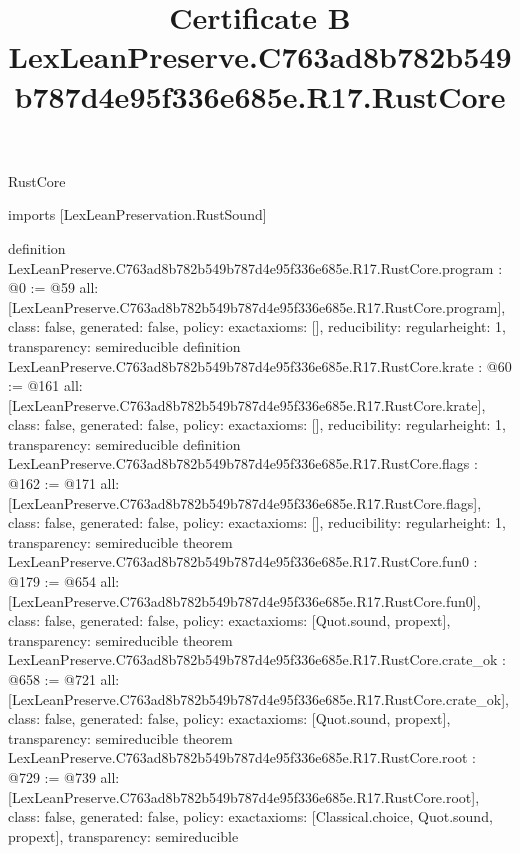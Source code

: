 \begin{lexlean}{RustCore}
\title{Certificate B LexLeanPreserve.C763ad8b782b549b787d4e95f336e685e.R17.RustCore}
\begin{coremodule}
imports [LexLeanPreservation.RustSound]

definition LexLeanPreserve.C763ad8b782b549b787d4e95f336e685e.R17.RustCore.program : @0 := @59 {
  all: [LexLeanPreserve.C763ad8b782b549b787d4e95f336e685e.R17.RustCore.program],
  class: false,
  generated: false,
  policy: exact{axioms: []},
  reducibility: regular{height: 1},
  transparency: semireducible
}
definition LexLeanPreserve.C763ad8b782b549b787d4e95f336e685e.R17.RustCore.krate : @60 := @161 {
  all: [LexLeanPreserve.C763ad8b782b549b787d4e95f336e685e.R17.RustCore.krate],
  class: false,
  generated: false,
  policy: exact{axioms: []},
  reducibility: regular{height: 1},
  transparency: semireducible
}
definition LexLeanPreserve.C763ad8b782b549b787d4e95f336e685e.R17.RustCore.flags : @162 := @171 {
  all: [LexLeanPreserve.C763ad8b782b549b787d4e95f336e685e.R17.RustCore.flags],
  class: false,
  generated: false,
  policy: exact{axioms: []},
  reducibility: regular{height: 1},
  transparency: semireducible
}
theorem LexLeanPreserve.C763ad8b782b549b787d4e95f336e685e.R17.RustCore.fun0 : @179 := @654 {
  all: [LexLeanPreserve.C763ad8b782b549b787d4e95f336e685e.R17.RustCore.fun0],
  class: false,
  generated: false,
  policy: exact{axioms: [Quot.sound, propext]},
  transparency: semireducible
}
theorem LexLeanPreserve.C763ad8b782b549b787d4e95f336e685e.R17.RustCore.crate_ok : @658 := @721 {
  all: [LexLeanPreserve.C763ad8b782b549b787d4e95f336e685e.R17.RustCore.crate_ok],
  class: false,
  generated: false,
  policy: exact{axioms: [Quot.sound, propext]},
  transparency: semireducible
}
theorem LexLeanPreserve.C763ad8b782b549b787d4e95f336e685e.R17.RustCore.root : @729 := @739 {
  all: [LexLeanPreserve.C763ad8b782b549b787d4e95f336e685e.R17.RustCore.root],
  class: false,
  generated: false,
  policy: exact{axioms: [Classical.choice, Quot.sound, propext]},
  transparency: semireducible
}


\end{coremodule}
\end{lexlean}
